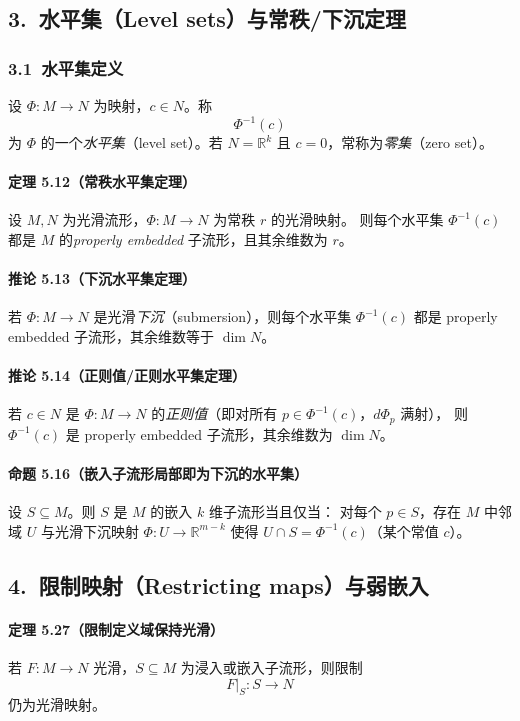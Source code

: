 \documentclass[11pt,a4paper]{article}
\begin{document}
\subsection*{3.\ 水平集（Level sets）与常秩/下沉定理}

\subsubsection*{3.1\ 水平集定义}
设 $\Phi:M\to N$ 为映射，$c\in N$。称
\[
\Phi^{-1}(c)
\]
为 $\Phi$ 的一个\emph{水平集}（level set）。若 $N=\mathbb{R}^k$ 且 $c=0$，常称为\emph{零集}（zero set）。

\paragraph{定理 5.12（常秩水平集定理）}
设 $M,N$ 为光滑流形，$\Phi:M\to N$ 为常秩 $r$ 的光滑映射。
则每个水平集 $\Phi^{-1}(c)$ 都是 $M$ 的\emph{properly embedded} 子流形，且其余维数为 $r$。

\paragraph{推论 5.13（下沉水平集定理）}
若 $\Phi:M\to N$ 是光滑\emph{下沉}（submersion），则每个水平集 $\Phi^{-1}(c)$
都是 properly embedded 子流形，其余维数等于 $\dim N$。

\paragraph{推论 5.14（正则值/正则水平集定理）}
若 $c\in N$ 是 $\Phi:M\to N$ 的\emph{正则值}（即对所有 $p\in\Phi^{-1}(c)$，$d\Phi_p$ 满射），
则 $\Phi^{-1}(c)$ 是 properly embedded 子流形，其余维数为 $\dim N$。

\paragraph{命题 5.16（嵌入子流形局部即为下沉的水平集）}
设 $S\subseteq M$。则 $S$ 是 $M$ 的嵌入 $k$ 维子流形当且仅当：
对每个 $p\in S$，存在 $M$ 中邻域 $U$ 与光滑下沉映射 $\Phi:U\to\mathbb{R}^{m-k}$
使得 $U\cap S=\Phi^{-1}(c)$（某个常值 $c$）。

\subsection*{4.\ 限制映射（Restricting maps）与弱嵌入}

\paragraph{定理 5.27（限制定义域保持光滑）}
若 $F:M\to N$ 光滑，$S\subseteq M$ 为浸入或嵌入子流形，则限制
\[
F|_S:S\to N
\]
仍为光滑映射。
\end{document}
